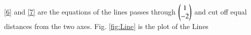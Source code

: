 \documentclass[journal,12pt,twocolumn]{IEEEtran}
\renewcommand\thesection{\arabic{section}}
\begin{document}
\begin{enumerate}[label=\thesection.\arabic*.,ref=\thesection.\theenumi]
\eqref{6} and \eqref{7} are the equations of the lines passes through $\begin{pmatrix}1\\-2\end{pmatrix}$ and cut off equal distances from the two axes.
Fig. \eqref{fig:Line} is the plot of the Lines
\end{enumerate}
\end{document}
